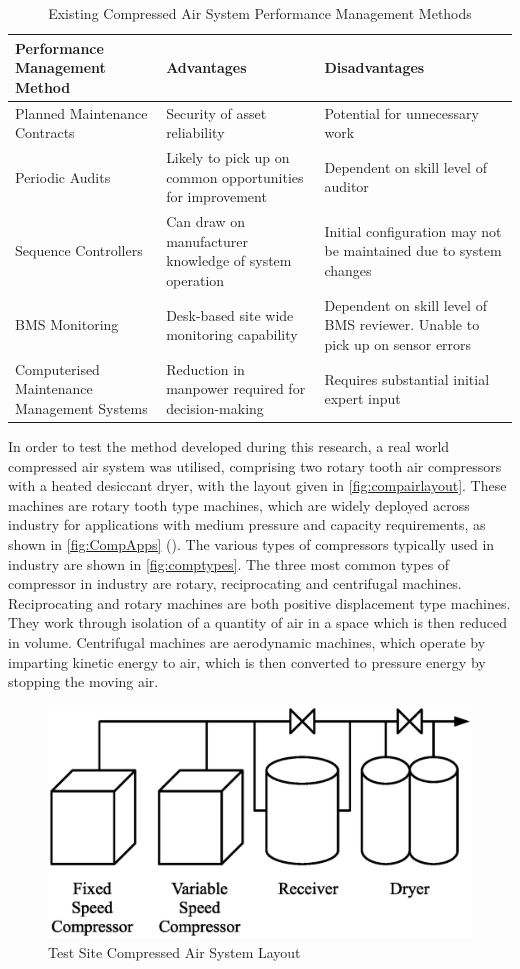 \begin{table}
  \centering
  \caption{Existing Compressed Air System Performance Management Methods}
    \begin{tabular}{p{.3\linewidth}|p{.3\linewidth}|p{.3\linewidth}}
    \toprule
    Performance Management Method & Advantages & Disadvantages \\
    \toprule
    Planned Maintenance Contracts & Security of asset reliability & Potential for unnecessary work \\
    \midrule
    Periodic Audits & Likely to pick up on common opportunities for improvement & Dependent on skill level of auditor \\
    \midrule
    Sequence Controllers & Can draw on manufacturer knowledge of system operation & Initial configuration may not be maintained due to system changes \\
    \midrule
    BMS Monitoring & Desk-based site wide monitoring capability & Dependent on skill level of BMS reviewer. Unable to pick up on sensor errors \\
    \midrule
    Computerised Maintenance Management Systems & Reduction in manpower required for decision-making & Requires substantial initial expert input\\
    \bottomrule
    \end{tabular}%
  \label{tab:perfmgmt}%
\end{table}%


In order to test the method developed during this research, a real world compressed air system was utilised, comprising two rotary tooth air compressors with a heated desiccant dryer, with the layout given in \autoref{fig:compairlayout}. These machines are rotary tooth type machines, which are widely deployed across industry for applications with medium pressure and capacity requirements, as shown in \autoref{fig:CompApps} (\cite{SEAI2007}). The various types of compressors typically used in industry are shown in \autoref{fig:comptypes}. The three most common types of compressor in industry are rotary, reciprocating and centrifugal machines. Reciprocating and rotary machines are both positive displacement type machines. They work through isolation of a quantity of air in a space which is then reduced in volume. Centrifugal machines are aerodynamic machines, which operate by imparting kinetic energy to air, which is then converted to pressure energy by stopping the moving air.

\begin{figure}
\includegraphics[width = 0.5\columnwidth]{./Images/PharmacyCompAir.eps}
\caption{Test Site Compressed Air System Layout}
\label{fig:compairlayout}
\end{figure}

